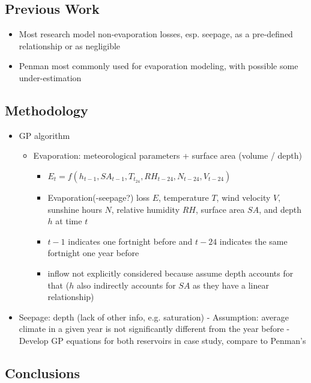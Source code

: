 \documentclass{article}
\begin{document}
\subsection{Previous Work}

\begin{itemize}
    \item Most research model non-evaporation losses, esp. seepage, as a pre-defined relationship or as negligible
    \item Penman most commonly used for evaporation modeling, with possible some under-estimation
\end{itemize}

\subsection{Methodology}

\begin{itemize}
    \item GP algorithm
          \begin{itemize}
              \item Evaporation: meteorological parameters + surface area (volume / depth)
                    \begin{itemize}
                        \item $E_t = f(h_{t-1}, SA_{t-1}, T_{t_24}, RH_{t-24}, N_{t-24}, V_{t-24})$
                        \item Evaporation(-seepage?) loss $E$, temperature $T$, wind velocity $V$, sunshine hours $N$, relative humidity $RH$, surface area $SA$, and depth $h$ at time $t$
                        \item $t-1$ indicates one fortnight before and $t-24$ indicates the same fortnight one year before
                        \item inflow not explicitly considered because assume depth accounts for that ($h$ also indirectly accounts for $SA$ as they have a linear relationship)
                    \end{itemize}
          \end{itemize}
    \item Seepage: depth (lack of other info, e.g. saturation)
          - Assumption: average climate in a given year is not significantly different from the year before
          - Develop GP equations for both reservoirs in case study, compare to Penman’s
\end{itemize}

\subsection{Conclusions}
\end{document}
